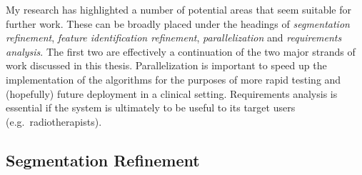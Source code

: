 \fi

My research has highlighted a number of potential areas that seem suitable for further work. These can be broadly placed under the headings of \emph{segmentation refinement}, \emph{feature identification refinement}, \emph{parallelization} and \emph{requirements analysis}. The first two are effectively a continuation of the two major strands of work discussed in this thesis. Parallelization is important to speed up the implementation of the algorithms for the purposes of more rapid testing and (hopefully) future deployment in a clinical setting. Requirements analysis is essential if the system is ultimately to be useful to its target users (e.g.~radiotherapists).

\subsection{Segmentation Refinement}


